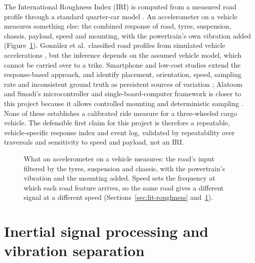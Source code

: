 The International Roughness Index (IRI) is computed from a measured road profile through a standard quarter-car model \cite{fhwa2016}. An accelerometer on a vehicle measures something else: the combined response of road, tyres, suspension, chassis, payload, speed and mounting, with the powertrain's own vibration added (Figure~\ref{fig:lit-chain}). Gonz\'alez et al.\ classified road profiles from simulated vehicle accelerations \cite{gonzalez2008}, but the inference depends on the assumed vehicle model, which cannot be carried over to a trike. Smartphone and low-cost studies extend the response-based approach, and identify placement, orientation, speed, sampling rate and inconsistent ground truth as persistent sources of variation \cite{sattar2018}; Alatoom and Smadi's microcontroller and single-board-computer framework is closer to this project because it allows controlled mounting and deterministic sampling \cite{alatoom2025}. None of these establishes a calibrated ride measure for a three-wheeled cargo vehicle. The defensible first claim for this project is therefore a repeatable, vehicle-specific response index and event log, validated by repeatability over traversals and sensitivity to speed and payload, not an IRI.

\begin{figure}[htbp]
\centering
\resizebox{\textwidth}{!}{}
\caption[What an accelerometer on a vehicle measures]{What an accelerometer on a vehicle measures: the road's input filtered by the tyres, suspension and chassis, with the powertrain's vibration and the mounting added. Speed sets the frequency at which each road feature arrives, so the same road gives a different signal at a different speed (Sections~\ref{sec:lit-roughness} and~\ref{sec:lit-signal-processing}).}
\label{fig:lit-chain}
\end{figure}

\section{Inertial signal processing and vibration separation}
\label{sec:lit-signal-processing}


